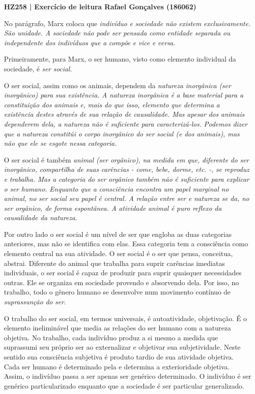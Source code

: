 \documentclass[12pt]{article}
\begin{document}
\noindent
\large\textbf{HZ258 | Exercício de leitura \hfill Rafael Gonçalves (186062)}
\break\hfill

No parágrafo, Marx coloca que \em indivíduo \em e \em sociedade \em não existem exclusivamente.
São unidade.
A sociedade não pode ser pensada como entidade separada ou independente dos indivíduos que a compõe e vice e versa.

Primeiramente, para Marx, o ser humano, visto como elemento individual da sociedade, é \em ser social\em.

O ser social, assim como os animais, dependem da \em natureza inorgânica \em (ser inorgânico) para sua existência.
A natureza inorgânica é a base material para a constituição dos animais e, mais do que isso, elemento que determina a existência destes através de sua relação de causalidade.
Mas apesar dos animais dependerem dela, a natureza não é suficiente para caracterizá-los.
Podemos dizer que a natureza constitúi o corpo inorgânico do ser social (e dos animais), mas não que ele se esgote nessa categoria.

O ser social é também \em animal \em (ser orgânico), na medida em que, diferente do ser inorgânico, compartilha de suas carências - come, bebe, dorme, etc. -, se reproduz e \em trabalha\em.
Mas a categoria do ser orgânico também não é suficiente para explicar o ser humano.
Enquanto que a consciência encontra um papel marginal no animal, no ser social seu papel é central.
A relação entre ser e natureza se da, no ser orgânico, de forma espontânea.
A atividade animal é puro reflexo da causalidade da natureza.

Por outro lado o ser social é um nível de ser que engloba as duas categorias anteriores, mas não se identifica com elas.
Essa categoria tem a consciência como elemento central na sua atividade.
O ser social é o ser que pensa, conceitua, abstrai.
Diferente do animal que trabalha para suprir carências imediatas individuais, o ser social é capaz de produzir para suprir quaisquer necessidades outras.
Ele se organiza em sociedade provendo e absorvendo dela.
Por isso, no trabalho, todo o gênero humano se desenvolve num movimento contínuo de \em suprassunção \em do ser.

O trabalho do ser social, em termos universais, é autoatividade, objetivação. 
É o elemento ineliminável que media as relações do ser humano com a natureza objetiva.
No trabalho, cada indivíduo produz a si mesmo a medida que suprassumi seu próprio ser ao externalizar e objetivar sua subjetividade.
Neste sentido sua consciência subjetiva é produto tardio de sua atividade objetiva.
Cada ser humano é determinado pela e determina a exterioridade objetiva.
Assim, o indivíduo passa a ser apenas ser genérico determinado.
O indivíduo é ser genérico particularizado enquanto que a sociedade é ser particular generalizado.
\end{document}

